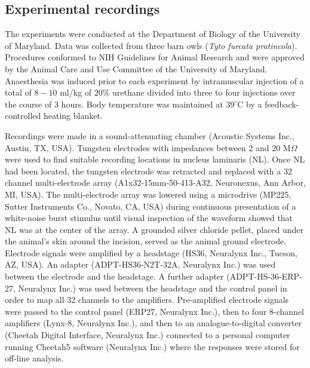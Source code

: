 \documentclass[]{elife}
\begin{document}
\subsection{Experimental recordings}\label{experimental-recordings}

The experiments were conducted at the Department of Biology of the
University of Maryland. Data was collected from three barn owls
(\emph{Tyto furcata pratincola}). Procedures conformed to NIH Guidelines
for Animal Research and were approved by the Animal Care and Use
Committee of the University of Maryland. Anaesthesia was induced prior
to each experiment by intramuscular injection of a total of \(8-10\)
ml/kg of \(20\%\) urethane divided into three to four injections over
the course of \(3\) hours. Body temperature was maintained at
\(39^\circ\)C by a feedback-controlled heating blanket.

Recordings were made in a sound-attenuating chamber (Acoustic Systems
Inc., Austin, TX, USA). Tungsten electrodes with impedances between
\(2\) and \(20\) M\(\Omega\) were used to find suitable recording
locations in nucleus laminaris (NL). Once NL had been located, the
tungsten electrode was retracted and replaced with a 32 channel
multi-electrode array (A1x32-15mm-50-413-A32, Neuronexus, Ann Arbor, MI,
USA). The multi-electrode array was lowered using a microdrive (MP225,
Sutter Instruments Co., Novato, CA, USA) during continuous presentation
of a white-noise burst stimulus until visual inspection of the waveform
showed that NL was at the center of the array. A grounded silver
chloride pellet, placed under the animal's skin around the incision,
served as the animal ground electrode. Electrode signals were amplified
by a headstage (HS36, Neuralynx Inc., Tucson, AZ, USA). An adapter
(ADPT-HS36-N2T-32A, Neuralynx Inc.) was used between the electrode and
the headstage. A further adapter (ADPT-HS-36-ERP-27, Neuralynx Inc.) was
used between the headstage and the control panel in order to map all 32
channels to the amplifiers. Pre-amplified electrode signals were passed
to the control panel (ERP27, Neuralynx Inc.), then to four 8-channel
amplifiers (Lynx-8, Neuralynx Inc.), and then to an analogue-to-digital
converter (Cheetah Digital Interface, Neuralynx Inc.) connected to a
personal computer running Cheetah5 software (Neuralynx Inc.) where the
responses were stored for off-line analysis.
\end{document}
